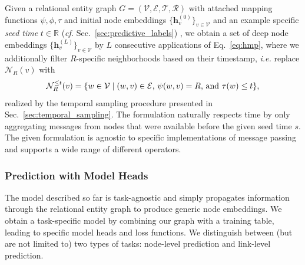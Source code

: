  Given a relational entity graph $G=(\mathcal{V}, \mathcal{E}, \mathcal{T}, \mathcal{R})$ with attached mapping functions $\psi, \phi, \tau$ and initial node embeddings $\{\mathbf{h}^{(0)}_v\}_{v\in\mathcal{V}}$ and an example specific \emph{seed time} $t\in \mathbb{R}$ (\emph{cf.} Sec.~\ref{sec:predictive_labels}) , we obtain a set of deep node embeddings $\{\mathbf{h}^{(L)}_v\}_{v\in\mathcal{V}}$ by $L$ consecutive applications of Eq.~\ref{eq:hmp}, where we additionally filter $R$-specific neighborhoods based on their timestamp, \emph{i.e.} replace $\mathcal{N}_R(v)$ with
\begin{equation}
     \mathcal{N}^{\leq t}_R(v) =\{w\in \mathcal{V} \mid (w,v)\in \mathcal{E} \textnormal{, } \psi(w, v) = R \textnormal{, and } \tau(w) \leq t\} \text{,}
\end{equation}
realized by the temporal sampling procedure presented in Sec.~\ref{sec:temporal_sampling}. The formulation naturally respects time by only aggregating messages from nodes that were available before the given seed time $s$. The given formulation is agnostic to specific implementations of message passing and supports a wide range of different operators.

\subsubsection{Prediction with Model Heads}
\label{sec:model_heads}

The model described so far is task-agnostic and simply propagates information through the relational entity graph to produce generic node embeddings. We obtain a task-specific model by combining our graph with a training table, leading to specific model heads and loss functions. We distinguish between (but are not limited to) two types of tasks: node-level prediction and link-level prediction.


